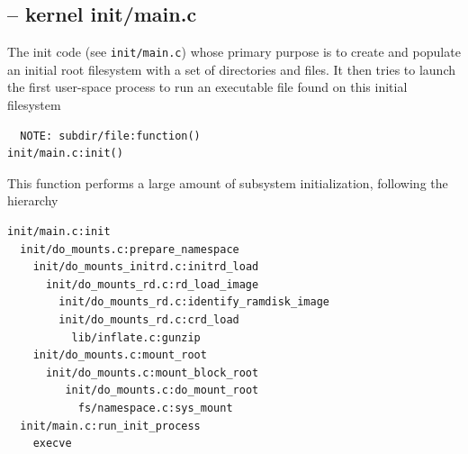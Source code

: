 


\subsection{-- kernel init/main.c}
\label{sec:init-main.c}

The init code (see \verb!init/main.c!) whose primary purpose is to create and
populate an initial root filesystem with a set of directories and files. It then tries to
launch the first user-space process to run an executable file found on this
initial filesystem
\begin{verbatim}
  NOTE: subdir/file:function()
init/main.c:init()
\end{verbatim}

This function performs a large amount of subsystem initialization, following the
hierarchy
\begin{verbatim}
init/main.c:init
  init/do_mounts.c:prepare_namespace
    init/do_mounts_initrd.c:initrd_load
      init/do_mounts_rd.c:rd_load_image
        init/do_mounts_rd.c:identify_ramdisk_image
        init/do_mounts_rd.c:crd_load
          lib/inflate.c:gunzip
    init/do_mounts.c:mount_root
      init/do_mounts.c:mount_block_root
         init/do_mounts.c:do_mount_root
           fs/namespace.c:sys_mount
  init/main.c:run_init_process
    execve
\end{verbatim}

